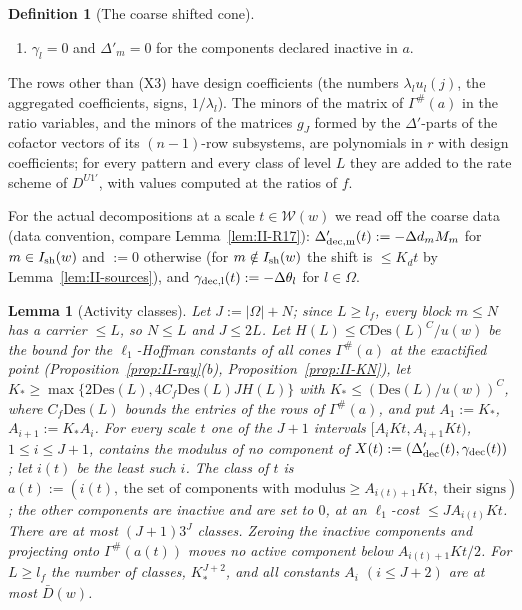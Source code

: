 \documentclass[10pt]{amsart}
\newtheorem{lemma}[theorem]{Lemma}
\theoremstyle{definition}
\newtheorem{definition}[theorem]{Definition}
\theoremstyle{remark}
\newcommand{\gap}{\operatorname{gap}}
\begin{document}
\begin{definition}[The coarse shifted cone]
\begin{enumerate}
$\gap^\#(k(l))<t^2$ for some $t\in\mathcal W(w)$ (near-threshold carriers);
\item[(X5)] $\gamma_l=0$ and $\Delta'_m=0$ for the components declared inactive in $a$.
\end{enumerate}
The rows other than (X3) have design coefficients (the numbers $\lambda_lu_l(j)$,
the aggregated coefficients, signs, $1/\lambda_l$).  The minors of the matrix of
$\Gamma^\#(a)$ in the ratio variables, and the minors of the matrices $g_J$ formed
by the $\Delta'$-parts of the cofactor vectors of its $(n-1)$-row subsystems, are
polynomials in $r$ with design coefficients; for every pattern and every
class of level $L$ they are added to the rate scheme of $D^{U1'}$, with values
computed at the ratios of $f$.
\end{definition}

For the actual decompositions at a scale $t\in\mathcal W(w)$ we read off the coarse
data (data convention, compare Lemma~\ref{lem:II-R17}): $\Delta'_{\rm dec,m}(t):=
-\Delta d_mM_m$ for $m\in I_{\rm sh}(w)$ and $:=0$ otherwise (for $m\notin I_{\rm sh}(w)$
the shift is $\le K_dt$ by Lemma~\ref{lem:II-sources}), and $\gamma_{\rm dec,l}(t):=
-\Delta\theta_l$ for $l\in\Omega$.

\begin{lemma}[Activity classes]\label{lem:II-classes}
Let $J:=|\Omega|+N$; since $L\ge l_f$, every block $m\le N$ has a carrier
$\le L$, so $N\le L$ and $J\le2L$.  Let $H(L)\le C\mathrm{Des}(L)^C/u(w)$ be
the bound for the $\ell_1$-Hoffman constants of all cones $\Gamma^\#(a)$ at
the exactified point \textup{(}Proposition~\textup{\ref{prop:II-ray}(b)},
Proposition~\textup{\ref{prop:II-KN}}\textup{)}, let $K_*\ge\max\{2\mathrm{Des}
(L),4C_f\mathrm{Des}(L)JH(L)\}$ with $K_*\le(\mathrm{Des}(L)/u(w))^C$, where
$C_f\mathrm{Des}(L)$ bounds the entries of the rows of $\Gamma^\#(a)$, and
put $A_1:=K_*$, $A_{i+1}:=K_*A_i$.  For every scale $t$ one of the $J+1$ intervals $[A_iKt,
A_{i+1}Kt)$, $1\le i\le J+1$, contains the modulus of no component of $X(t):=
(\Delta'_{\rm dec}(t),\gamma_{\rm dec}(t))$; let $i(t)$ be the least such $i$.  The
\emph{class} of $t$ is $a(t):=(i(t),\ \text{the set of components with modulus}\ge
A_{i(t)+1}Kt,\ \text{their signs})$; the other components are \emph{inactive} and
are set to $0$, at an $\ell_1$-cost $\le JA_{i(t)}Kt$.  There are at most $(J+1)3^J$
classes.  Zeroing the inactive components and projecting onto $\Gamma^\#(a(t))$ moves
no active component below $A_{i(t)+1}Kt/2$.  For $L\ge l_f$ the number of
classes, $K_*^{J+2}$, and all constants $A_i$ $(i\le J+2)$ are at most
$\bar D(w)$.
\end{lemma}
\end{document}
